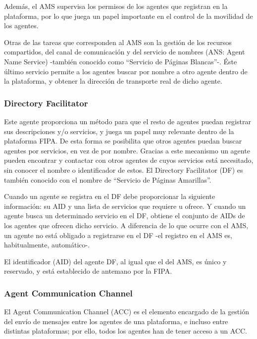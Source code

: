Además, el AMS supervisa los permisos de los agentes que registran en la
plataforma, por lo que juega un papel importante en el control de la movilidad
de los agentes.

Otras de las tareas que corresponden al AMS son la gestión de los recursos
compartidos, del canal de comunicación y del servicio de nombres (ANS: Agent
Name Service) -también conocido como ``Servicio de Páginas Blancas''-. Éste
último servicio permite a los agentes buscar por nombre a otro agente dentro de
la plataforma, y obtener la dirección de transporte real de dicho agente.

\subsubsection{Directory Facilitator}

Este agente proporciona un método para que el resto de agentes puedan registrar
sus descripciones y/o servicios, y juega un papel muy relevante dentro de la
plataforma FIPA. De esta forma se posibilita que otros agentes puedan buscar
agentes por servicios, en vez de por nombre. Gracias a este mecanismo un agente
pueden encontrar y contactar con otros agentes de cuyos servicios está
necesitado, sin conocer el nombre o identificador de estos. El Directory
Facilitator (DF) es también conocido con el nombre de ``Servicio de Páginas
Amarillas''.

Cuando un agente se registra en el DF debe proporcionar la siguiente
información: su AID y una lista de servicios que requiere u ofrece. Y cuando un
agente busca un determinado servicio en el DF, obtiene el conjunto de AIDs de
los agentes que ofrecen dicho servicio. A diferencia de lo que ocurre con el
AMS, un agente no está obligado a registrarse en el DF -el registro en el AMS
es, habitualmente, automático-.

El identificador (AID) del agente DF, al igual que el del AMS, es único y
reservado, y está establecido de antemano por la FIPA.

\subsubsection{Agent Communication Channel}

El Agent Communication Channel (ACC) es el elemento encargado de la gestión del
envío de mensajes entre los agentes de una plataforma, e incluso entre distintas
plataformas; por ello, todos los agentes han de tener acceso a un ACC.

